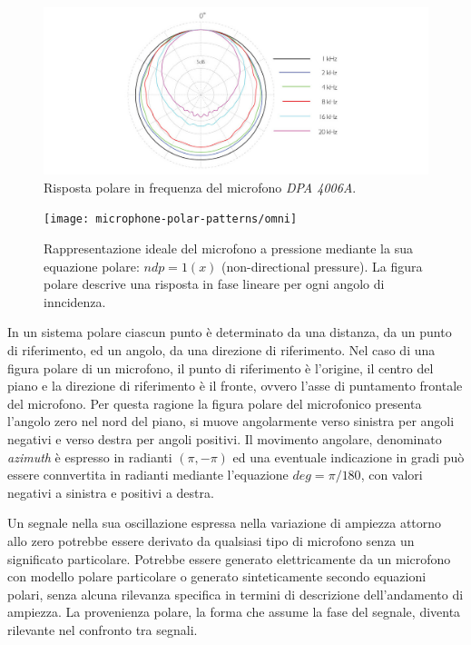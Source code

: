 \begin{refsection}
\begin{figure}[h]
\centering
\includegraphics[width=0.99\columnwidth]{CAPITOLI/1000/IMG/4006A-ddicate-4006A-Omni-Microphone-polar-pattern.jpg}
\caption[]{Risposta polare in frequenza del microfono \emph{DPA 4006A}.}%
\label{pol:dpa4006}
\end{figure}

\begin{figure}[t]
\centering
\texttt{[image: microphone-polar-patterns/omni]}
\caption[]{Rappresentazione ideale del microfono a pressione mediante la sua
equazione polare: $ndp = 1(x)$ (non-directional pressure). La figura polare
descrive una risposta in fase lineare per ogni angolo di inncidenza.}
\label{polar:omni}
\end{figure}

In un sistema polare ciascun punto è
determinato da una distanza, da un punto di riferimento, ed un angolo, da una
direzione di riferimento. Nel caso di una figura polare di un microfono, il
punto di riferimento è l'origine, il centro del piano e la direzione di
riferimento è il fronte, ovvero l'asse di puntamento frontale del microfono. Per
questa ragione la figura polare del microfonico presenta l'angolo zero
nel nord del piano, si muove angolarmente verso sinistra per angoli
negativi e verso destra per angoli positivi. Il movimento angolare, denominato
\emph{azimuth} è espresso in radianti $(\pi,-\pi)$ ed una eventuale indicazione in
gradi può essere connvertita in radianti mediante l'equazione $deg = \pi/180$,
con valori negativi a sinistra e positivi a destra.

Un segnale nella sua oscillazione espressa nella variazione di ampiezza
attorno allo zero potrebbe essere derivato da qualsiasi tipo di microfono senza
un significato particolare. Potrebbe essere generato elettricamente da un
microfono con modello polare particolare o generato sinteticamente secondo equazioni polari, senza
alcuna rilevanza specifica in termini di descrizione dell'andamento di ampiezza.
La provenienza polare, la forma che assume la fase del segnale, diventa rilevante nel confronto tra segnali.


\end{refsection}

